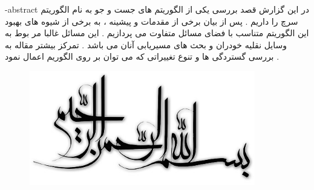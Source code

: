 \graphicspath{ {./img} }
\fa-abstract{
در این گزارش قصد بررسی یکی از الگوریتم های جست و جو به نام الگوریتم سرچ 
را داریم . پس از بیان برخی از مقدمات و پیشینه ، به برخی از شیوه های بهبود این الگوریتم متناسب با فضای مسائل متفاوت می پردازیم . این مسائل غالبا مر بوط به وسایل نقلیه خودران و بحث های مسیریابی آنان می باشد . تمرکز بیشتر مقاله به بررسی گستردگی ها و تنوع تغییراتی که می توان بر روی الگوریم 
اعمال نمود .
}


\renewcommand{\bibname}{مراجع}



\AUTtitle
\vspace*{7cm}
\thispagestyle{empty}
\begin{center}
\includegraphics[height=5cm,width=12cm]{besm}
\end{center}